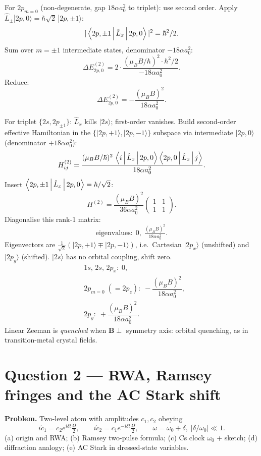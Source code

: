 \documentclass[11pt]{article}
\begin{document}
For $2p_{m=0}$ (non-degenerate, gap $18\alpha a_0^2$ to triplet): use second order. Apply $\hat L_\pm|2p,0\rangle=\hbar\sqrt 2\,|2p,\pm 1\rangle$:
\[
|\Braket{2p,\pm 1|\hat L_x|2p,0}|^2=\hbar^2/2.
\]
Sum over $m=\pm 1$ intermediate states, denominator $-18\alpha a_0^2$:
\[
\Delta E_{2p,0}^{(2)}=2\cdot\frac{(\mu_B B/\hbar)^2\cdot\hbar^2/2}{-18\alpha a_0^2}.
\]
Reduce:
\[
\Delta E_{2p,0}^{(2)}=-\frac{(\mu_B B)^2}{18\alpha a_0^2}.
\]

For triplet $\{2s,2p_{\pm 1}\}$: $\hat L_x$ kills $|2s\rangle$; first-order vanishes. Build second-order effective Hamiltonian in the $\{|2p,+1\rangle,|2p,-1\rangle\}$ subspace via intermediate $|2p,0\rangle$ (denominator $+18\alpha a_0^2$):
\[
H^{(2)}_{ij}=\frac{(\mu_B B/\hbar)^2\,\Braket{i|\hat L_x|2p,0}\Braket{2p,0|\hat L_x|j}}{18\alpha a_0^2}.
\]
Insert $\Braket{2p,\pm 1|\hat L_x|2p,0}=\hbar/\sqrt 2$:
\[
H^{(2)}=\frac{(\mu_B B)^2}{36\alpha a_0^2}\begin{pmatrix}1 & 1\\ 1 & 1\end{pmatrix}.
\]
Diagonalise this rank-1 matrix:
\[
\text{eigenvalues}:\;0,\;\tfrac{(\mu_B B)^2}{18\alpha a_0^2}.
\]
Eigenvectors are $\tfrac{1}{\sqrt 2}(|2p,+1\rangle\mp|2p,-1\rangle)$, i.e.\ Cartesian $|2p_x\rangle$ (unshifted) and $|2p_y\rangle$ (shifted). $|2s\rangle$ has no orbital coupling, shift zero.
\begin{equation}
\boxed{\;
\begin{aligned}
&1s,\,2s,\,2p_x:\;0,\\
&2p_{m=0}\;(=2p_z):\;-\dfrac{(\mu_B B)^2}{18\alpha a_0^2},\\
&2p_y:\;+\dfrac{(\mu_B B)^2}{18\alpha a_0^2}.
\end{aligned}\;}
\label{eq:Bx}
\end{equation}
Linear Zeeman is \emph{quenched} when $\bm B\perp$ symmetry axis: orbital quenching, as in transition-metal crystal fields.

\section*{Question 2 --- RWA, Ramsey fringes and the AC Stark shift}

\textbf{Problem.} Two-level atom with amplitudes $c_1,c_2$ obeying
\begin{equation}
i\dot c_1=c_2 e^{i\delta t}\tfrac{\Omega}{2},\qquad i\dot c_2=c_1 e^{-i\delta t}\tfrac{\Omega}{2},\qquad\omega=\omega_0+\delta,\;|\delta/\omega_0|\ll 1.
\label{eq:RWA}
\end{equation}
(a) origin and RWA; (b) Ramsey two-pulse formula; (c) Cs clock $\omega_0$ + sketch; (d) diffraction analogy; (e) AC Stark in dressed-state variables.
\end{document}
